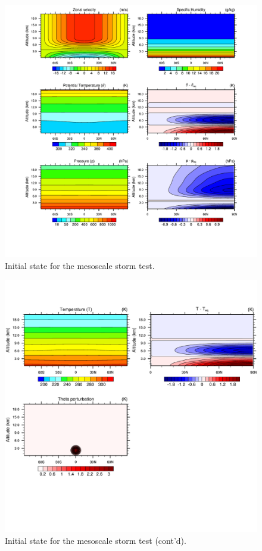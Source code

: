 \documentclass[times,doublespace]{fldauth}
\begin{document}
{\begin{figure}[tb]
\center\includegraphics[width=\linewidth]{plot_mesoscalestorm_init.pdf}
  \caption{Initial state for the mesoscale storm test.}\label{fig:mesoscalestorm_init_p1}
\end{figure} 
\begin{figure}[tb]
\center\includegraphics[width=\linewidth]{plot_mesoscalestorm_init_p2.pdf}
  \caption{Initial state for the mesoscale storm test (cont'd).}\label{fig:mesoscalestorm_init_p2}
\end{figure} 

}
\end{document}
